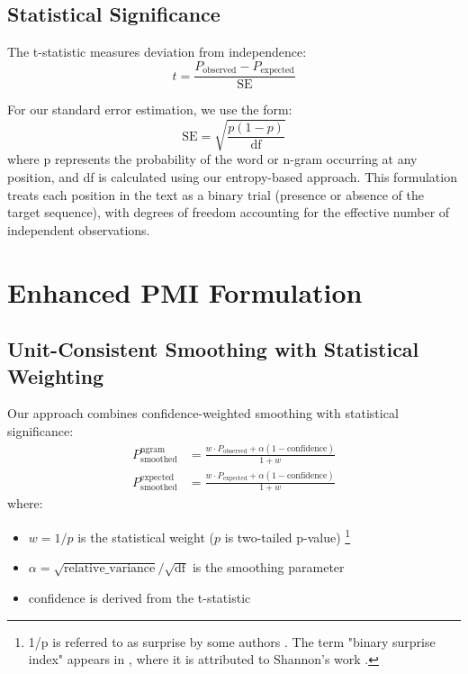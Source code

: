 \documentclass[12pt,a4paper]{article}
\begin{document}
\subsection{Statistical Significance}
The t-statistic measures deviation from independence:
\begin{equation}
    t = \frac{P_{\text{observed}} - P_{\text{expected}}}{\text{SE}}
\end{equation}

For our standard error estimation, we use the form:
\begin{equation}
    \text{SE} = \sqrt{\frac{p(1-p)}{\text{df}}}
\end{equation}
where p represents the probability of the word or n-gram occurring at any position, and df is calculated using our entropy-based approach. This formulation treats each position in the text as a binary trial (presence or absence of the target sequence), with degrees of freedom accounting for the effective number of independent observations.

\section{Enhanced PMI Formulation}

\subsection{Unit-Consistent Smoothing with Statistical Weighting}
Our approach combines confidence-weighted smoothing with statistical significance:
\begin{align}
    P_{\text{smoothed}}^{\text{ngram}} &= \frac{w \cdot P_{\text{observed}} + \alpha(1 - \text{confidence})}{1 + w} \\
    P_{\text{smoothed}}^{\text{expected}} &= \frac{w \cdot P_{\text{expected}} + \alpha(1 - \text{confidence})}{1 + w}
\end{align}
where:
\begin{itemize}
    \item $w = 1/p$ is the statistical weight ($p$ is two-tailed p-value) \footnote{1/p is referred to as surprise by some authors \cite{stone2019}. The term "binary surprise index" appears in \cite{cole2021}, where it is attributed to Shannon's work \cite{shannon1948}.}
    \item $\alpha = \sqrt{\text{relative\_variance}}/\sqrt{\text{df}}$ is the smoothing parameter
    \item confidence is derived from the t-statistic
\end{itemize}
\end{document}
